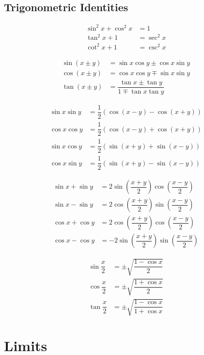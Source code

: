 \documentclass[fleqn, a4paper, 10pt]{article}
\theoremstyle{definition}
\theoremstyle{theorem}
\theoremstyle{remark}
\begin{document}
\begin{multicols}{2}
\subsection{Trigonometric Identities}

\begin{align*}
	\sin^2 x + \cos^2 x &= 1\\
	\tan^2 x + 1 &= \sec^2 x\\
	\cot^2 x + 1 &= \csc^2 x
\end{align*}

\begin{align*}
	\sin(x \pm y) &= \sin x \cos y \pm \cos x \sin y\\
	\cos(x \pm y) &= \cos x \cos y \mp \sin x \sin y\\
	\tan(x \pm y) &= \dfrac{\tan x \pm \tan y}{1 \mp \tan x \tan y}
\end{align*}

\begin{align*}
	\sin x \sin y &= \dfrac{1}{2} \left( \cos(x - y) - \cos(x + y) \right)\\
	\cos x \cos y &= \dfrac{1}{2} \left( \cos(x - y) + \cos(x + y) \right)\\
	\sin x \cos y &= \dfrac{1}{2} \left( \sin(x + y) + \sin(x - y) \right)\\
	\cos x \sin y &= \dfrac{1}{2} \left( \sin(x + y) - \sin(x - y) \right)
\end{align*}

\begin{align*}
	\sin x + \sin y &= 2 \sin \left( \dfrac{x + y}{2} \right) \cos \left( \dfrac{x - y}{2} \right)\\
	\sin x - \sin y &= 2 \cos \left( \dfrac{x + y}{2} \right) \sin \left( \dfrac{x - y}{2} \right)\\
	\cos x + \cos y &= 2 \cos \left( \dfrac{x + y}{2} \right) \cos \left( \dfrac{x - y}{2} \right)\\
	\cos x - \cos y &= -2 \sin \left( \dfrac{x + y}{2} \right) \sin \left( \dfrac{x - y}{2} \right)
\end{align*}

\begin{align*}
	\sin \dfrac{x}{2} &= \pm \sqrt{\dfrac{1 - \cos x}{2}}\\
	\cos \dfrac{x}{2} &= \pm \sqrt{\dfrac{1 + \cos x}{2}}\\
	\tan \dfrac{x}{2} &= \pm \sqrt{\dfrac{1 - \cos x}{1 + \cos x}}
\end{align*}

\section{Limits}


\end{multicols}
\end{document}
